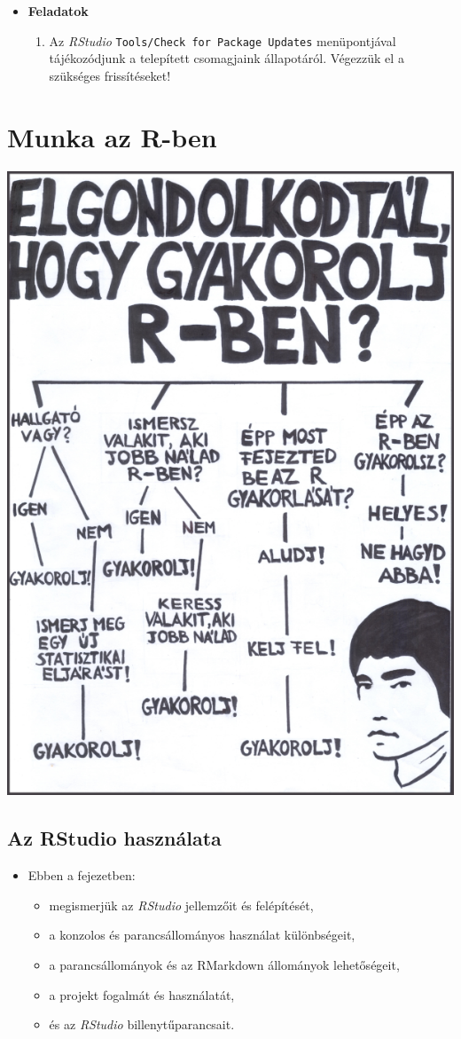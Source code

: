 \documentclass[
]{book}
\providecommand{\tightlist}{%
  \setlength{\itemsep}{0pt}\setlength{\parskip}{0pt}}
\newenvironment{rmdblock}[1]
  {\begin{shaded*}
  \begin{itemize}
  \renewcommand{\labelitemi}{
    \raisebox{-.7\height}[0pt][0pt]{
      {\setkeys{Gin}{width=3em,keepaspectratio}\texttt{[image: images/\#1]}}
    }
  }
  \item
  }
  {
  \end{itemize}
  \end{shaded*}
  }
\newenvironment{rmdlevel1}
  {\begin{rmdblock}{level1}}
  {\end{rmdblock}}
\newenvironment{rmdexercise}
  {\begin{rmdblock}{exercise}}
  {\end{rmdblock}}
\begin{document}
\begin{rmdexercise}
\textbf{Feladatok}

\begin{enumerate}
\def\labelenumi{\arabic{enumi}.}
\tightlist
\item
  Az \emph{RStudio} \texttt{Tools/Check\ for\ Package\ Updates} menüpontjával tájékozódjunk a telepített csomagjaink állapotáról. Végezzük el a szükséges frissítéseket!
\end{enumerate}
\end{rmdexercise}

\hypertarget{munka-az-r-ben}{%
\chapter{Munka az R-ben}\label{munka-az-r-ben}}

\begin{center}\includegraphics[width=0.7\linewidth]{images/ch_04_small} \end{center}

\hypertarget{AzRStudiohasznalata}{%
\section{Az RStudio használata}\label{AzRStudiohasznalata}}

\begin{rmdlevel1}
Ebben a fejezetben:

\begin{itemize}
\tightlist
\item
  megismerjük az \emph{RStudio} jellemzőit és felépítését,
\item
  a konzolos és parancsállományos használat különbségeit,
\item
  a parancsállományok és az RMarkdown állományok lehetőségeit,
\item
  a projekt fogalmát és használatát,
\item
  és az \emph{RStudio} billenytűparancsait.
\end{itemize}
\end{rmdlevel1}
\end{document}
